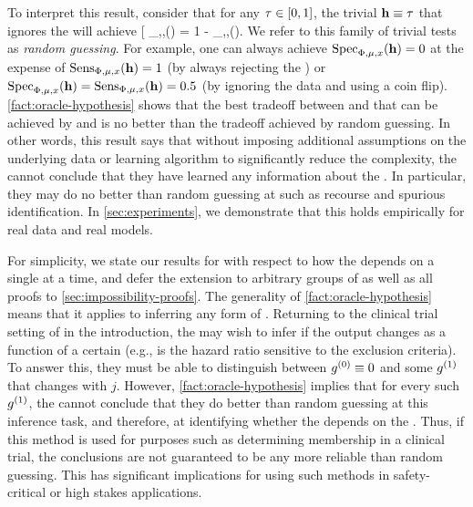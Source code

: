 %
To interpret this result, consider that for any $\tau\in[0,1]$, the trivial \hyptestname{} $\mathbf{h} \equiv \tau$ that ignores the \modelname{}
%
will achieve
\*[
    \specsym_{\expdef,\covdist,\covval}(\oraclehyptest)
    = 1 - \senssym_{\expdef,\covdist,\covval}(\oraclehyptest).
\]
We refer to this family of trivial tests as \emph{random guessing}.
For example, one can always achieve $\mathrm{Spec}_{\Phi,\mu,x}(\mathbf{h}) = 0$ at the expense of $\mathrm{Sens}_{\Phi,\mu,x}(\mathbf{h}) = 1$ (by always rejecting the \nullname{}) or $\mathrm{Spec}_{\Phi,\mu,x}(\mathbf{h}) = \mathrm{Sens}_{\Phi,\mu,x}(\mathbf{h}) = 0.5$ (by ignoring the data and using a coin flip).
\cref{fact:oracle-hypothesis} shows that the best tradeoff between \sensname{} and \specname{} that can be achieved by \completename{} and \additivename{} \fielddefnames{} is no better than the tradeoff achieved by random guessing.
In other words, this result says that without imposing additional assumptions on the underlying data or learning algorithm to significantly reduce the \modelname{} complexity, the \username{} cannot conclude that they have learned any information about the \modelname{}.
In particular, they may do no better than random guessing at \downtasknames{} such as recourse and spurious \covname{} identification. %
In \cref{sec:experiments}, we demonstrate that this holds empirically for real data and real models.

For simplicity, we state our results for \countmodbehaviourname{} with respect to how the \modelname{} depends on a single \covname{} at a time, and defer the extension to arbitrary groups of \covnames{} as well as all proofs to \cref{sec:impossibility-proofs}.
The generality of \cref{fact:oracle-hypothesis} means that it applies to inferring any form of \countmodbehaviourname{}.
Returning to the clinical trial setting
of \citet{liu21oncology} in the introduction, the \username{} may wish to infer if the \modelname{} output changes as a function of a certain \covname{} (e.g., is the hazard ratio sensitive to the exclusion criteria).
To answer this, they must be able to distinguish between $g^{(0)} \equiv 0$ and some $g^{(1)}$ that changes with \covname{} $j$.
However, \cref{fact:oracle-hypothesis} implies that for every such $g^{(1)}$, the \username{} cannot conclude that they do better than random guessing at this inference task, and therefore, at identifying whether the \modelname{} depends on the \covname{}.
Thus, if this method is used for purposes such as determining membership in a clinical trial, the conclusions are not guaranteed to be any more reliable than random guessing. This has significant implications for using such methods in safety-critical or high stakes applications.

